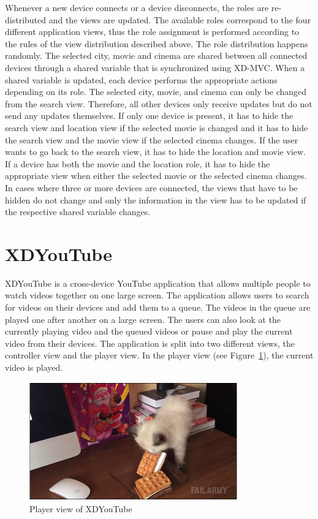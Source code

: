 Whenever a new device connects or a device disconnects, the roles are re-distributed and the views are updated. The available roles correspond to the four different application views, thus the role assignment is performed according to the rules of the view distribution described above. The role distribution happens randomly. The selected city, movie and cinema are shared between all connected devices through a shared variable that is synchronized using XD-MVC. When a shared variable is updated, each device performs the appropriate actions depending on its role. The selected city, movie, and cinema can only be changed from the search view. Therefore, all other devices only receive updates but do not send any updates themselves. If only one device is present, it has to hide the search view and location view if the selected movie is changed and it has to hide the search view and the movie view if the selected cinema changes. If the user wants to go back to the search view, it has to hide the location and movie view. If a device has both the movie and the location role, it has to hide the appropriate view when either the selected movie or the selected cinema changes. In cases where three or more devices are connected, the views that have to be hidden do not change and only the information in the view has to be updated if the respective shared variable changes. 

\section{XDYouTube}

XDYouTube is a cross-device YouTube application that allows multiple people to watch videos together on one large screen. The application allows users to search for videos on their devices and add them to a queue. The videos in the queue are played one after another on a large screen. The users can also look at the currently playing video and the queued videos or pause and play the current video from their devices. The application is split into two different views, the controller view and the player view. In the player view (see Figure~\ref{fig:xdyt_player}), the current video is played. 

\begin{figure}[H]
  \centering
    \includegraphics[width=0.8\textwidth]{images/screenshots/xdyt/player.png}
	\caption[Screenshot XDYouTube: Player view]{Player view of XDYouTube}
	\label{fig:xdyt_player}
\end{figure}


